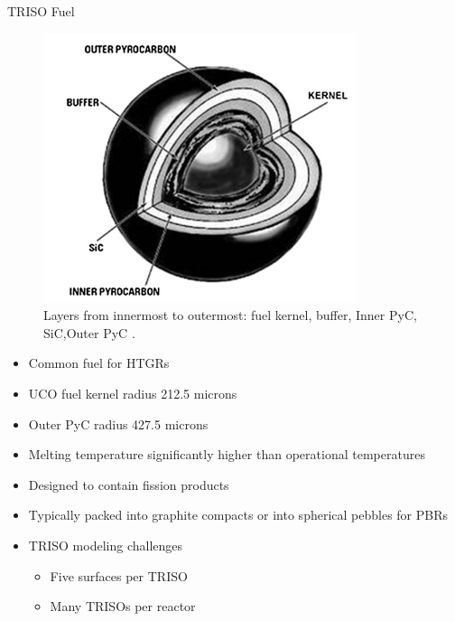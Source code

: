 \documentclass[9pt,t,aspectratio=169]{beamer}
\begin{document}
\begin{frame}{TRISO Fuel}
    \begin{minipage}[t]{0.45\linewidth}
        \begin{figure}
            \centering
            \includegraphics[width=0.9\linewidth]{figures/TRISO_diagram_Zhou_Tang.png}
            \caption{Layers from innermost to outermost: fuel kernel, buffer, Inner PyC, SiC,Outer PyC \cite{zhou_tang}.}
        \end{figure}
    \end{minipage}
    \hfill%
    \begin{minipage}[t]{0.45\linewidth}
        \begin{itemize}
            \item Common fuel for HTGRs
            \item UCO fuel kernel radius 212.5 microns
            \item Outer PyC radius 427.5 microns
            \item Melting temperature significantly higher than operational temperatures \cite{zhou_tang}
            \item Designed to contain fission products \cite{zhou_tang}
            \item Typically packed into graphite compacts or into spherical pebbles for PBRs
            \item TRISO modeling challenges
            \begin{itemize}
                \item Five surfaces per TRISO
                \item Many TRISOs per reactor
            \end{itemize}
        \end{itemize}
    \end{minipage}
\end{frame}
\end{document}
